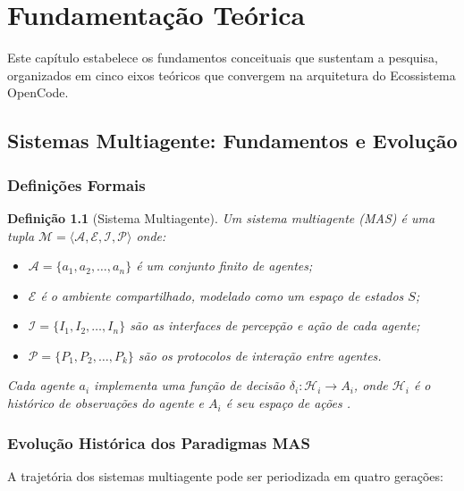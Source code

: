 \documentclass[12pt,a4paper,sumario=tradicional]{abntex2}
\newtheorem{definition}{Definição}[chapter]
\begin{document}
\chapter{Fundamentação Teórica}

Este capítulo estabelece os fundamentos conceituais que sustentam a pesquisa, organizados em cinco eixos teóricos que convergem na arquitetura do Ecossistema OpenCode.

\section{Sistemas Multiagente: Fundamentos e Evolução}

\subsection{Definições Formais}

\begin{definition}[Sistema Multiagente]
Um sistema multiagente (MAS) é uma tupla $\mathcal{M} = \langle \mathcal{A}, \mathcal{E}, \mathcal{I}, \mathcal{P} \rangle$ onde:
\begin{itemize}
    \item $\mathcal{A} = \{a_1, a_2, \ldots, a_n\}$ é um conjunto finito de agentes;
    \item $\mathcal{E}$ é o ambiente compartilhado, modelado como um espaço de estados $S$;
    \item $\mathcal{I} = \{I_1, I_2, \ldots, I_n\}$ são as interfaces de percepção e ação de cada agente;
    \item $\mathcal{P} = \{P_1, P_2, \ldots, P_k\}$ são os protocolos de interação entre agentes.
\end{itemize}
Cada agente $a_i$ implementa uma função de decisão $\delta_i: \mathcal{H}_i \rightarrow A_i$, onde $\mathcal{H}_i$ é o histórico de observações do agente e $A_i$ é seu espaço de ações \cite{wooldridge2009mas}.
\end{definition}

\subsection{Evolução Histórica dos Paradigmas MAS}

A trajetória dos sistemas multiagente pode ser periodizada em quatro gerações:
\end{document}
